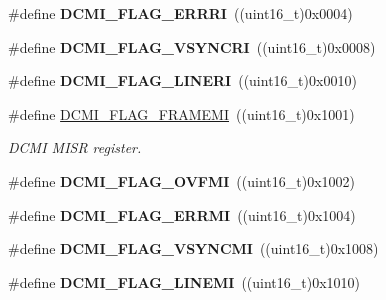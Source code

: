 \begin{DoxyCompactItemize}
\item 
\hypertarget{group___d_c_m_i___flags_ga38108fd82e34f856f2cc2289d5809143}{}\#define {\bfseries D\+C\+M\+I\+\_\+\+F\+L\+A\+G\+\_\+\+E\+R\+R\+R\+I}~((uint16\+\_\+t)0x0004)\label{group___d_c_m_i___flags_ga38108fd82e34f856f2cc2289d5809143}

\item 
\hypertarget{group___d_c_m_i___flags_ga684fd8d6f4d02ec7e9113a5a4caa6484}{}\#define {\bfseries D\+C\+M\+I\+\_\+\+F\+L\+A\+G\+\_\+\+V\+S\+Y\+N\+C\+R\+I}~((uint16\+\_\+t)0x0008)\label{group___d_c_m_i___flags_ga684fd8d6f4d02ec7e9113a5a4caa6484}

\item 
\hypertarget{group___d_c_m_i___flags_ga291eae13e645d5303690dc07a8cfcfde}{}\#define {\bfseries D\+C\+M\+I\+\_\+\+F\+L\+A\+G\+\_\+\+L\+I\+N\+E\+R\+I}~((uint16\+\_\+t)0x0010)\label{group___d_c_m_i___flags_ga291eae13e645d5303690dc07a8cfcfde}

\item 
\hypertarget{group___d_c_m_i___flags_gad6373f50f9681c59b0406c8c1ae3aac1}{}\#define \hyperlink{group___d_c_m_i___flags_gad6373f50f9681c59b0406c8c1ae3aac1}{D\+C\+M\+I\+\_\+\+F\+L\+A\+G\+\_\+\+F\+R\+A\+M\+E\+M\+I}~((uint16\+\_\+t)0x1001)\label{group___d_c_m_i___flags_gad6373f50f9681c59b0406c8c1ae3aac1}

\begin{DoxyCompactList}\small\item\em D\+C\+M\+I M\+I\+S\+R register. \end{DoxyCompactList}\item 
\hypertarget{group___d_c_m_i___flags_gaec0c82ddcc3994b877a2f904c680e2b1}{}\#define {\bfseries D\+C\+M\+I\+\_\+\+F\+L\+A\+G\+\_\+\+O\+V\+F\+M\+I}~((uint16\+\_\+t)0x1002)\label{group___d_c_m_i___flags_gaec0c82ddcc3994b877a2f904c680e2b1}

\item 
\hypertarget{group___d_c_m_i___flags_ga32d9f0793f2c0758c05e07e273251e96}{}\#define {\bfseries D\+C\+M\+I\+\_\+\+F\+L\+A\+G\+\_\+\+E\+R\+R\+M\+I}~((uint16\+\_\+t)0x1004)\label{group___d_c_m_i___flags_ga32d9f0793f2c0758c05e07e273251e96}

\item 
\hypertarget{group___d_c_m_i___flags_ga9933cab890dbebea51db4aa71a11f90d}{}\#define {\bfseries D\+C\+M\+I\+\_\+\+F\+L\+A\+G\+\_\+\+V\+S\+Y\+N\+C\+M\+I}~((uint16\+\_\+t)0x1008)\label{group___d_c_m_i___flags_ga9933cab890dbebea51db4aa71a11f90d}

\item 
\hypertarget{group___d_c_m_i___flags_ga9c409d7ee355083e9b73f267f94d44e3}{}\#define {\bfseries D\+C\+M\+I\+\_\+\+F\+L\+A\+G\+\_\+\+L\+I\+N\+E\+M\+I}~((uint16\+\_\+t)0x1010)\label{group___d_c_m_i___flags_ga9c409d7ee355083e9b73f267f94d44e3}


\end{DoxyCompactItemize}
